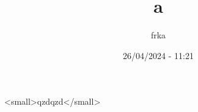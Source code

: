 \documentclass{article}
\title{a}
\date{26/04/2024 - 11:21}
\author{frka}
\begin{document}
\maketitle
<small>qzdqzd</small>
\end{document}
